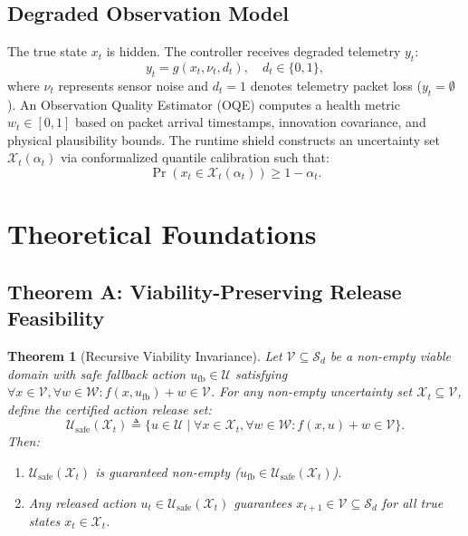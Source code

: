 \documentclass[conference]{IEEEtran}
\newtheorem{theorem}{Theorem}
\begin{document}
\subsection{Degraded Observation Model}
The true state $x_t$ is hidden. The controller receives degraded telemetry $y_t$:
\begin{equation}
y_t = g(x_t, \nu_t, d_t), \quad d_t \in \{0, 1\},
\end{equation}
where $\nu_t$ represents sensor noise and $d_t = 1$ denotes telemetry packet loss ($y_t = \emptyset$). 
An Observation Quality Estimator (OQE) computes a health metric $w_t \in [0, 1]$ based on packet arrival timestamps, innovation covariance, and physical plausibility bounds. The runtime shield constructs an uncertainty set $\mathcal{X}_t(\alpha_t)$ via conformalized quantile calibration \cite{romano_cqr_2019,gibbs_aci_2021} such that:
\begin{equation}
\Pr(x_t \in \mathcal{X}_t(\alpha_t)) \ge 1 - \alpha_t.
\end{equation}

\section{Theoretical Foundations}

\subsection{Theorem A: Viability-Preserving Release Feasibility}
\begin{theorem}[Recursive Viability Invariance]
Let $\mathcal{V} \subseteq \mathcal{S}_d$ be a non-empty viable domain with safe fallback action $u_{\mathrm{fb}} \in \mathcal{U}$ satisfying $\forall x \in \mathcal{V}, \forall w \in \mathcal{W}: f(x, u_{\mathrm{fb}}) + w \in \mathcal{V}$.
For any non-empty uncertainty set $\mathcal{X}_t \subseteq \mathcal{V}$, define the certified action release set:
\begin{equation}
\mathcal{U}_{\mathrm{safe}}(\mathcal{X}_t) \triangleq \{ u \in \mathcal{U} \mid \forall x \in \mathcal{X}_t, \forall w \in \mathcal{W}: f(x, u) + w \in \mathcal{V} \}.
\end{equation}
Then:
\begin{enumerate}
    \item $\mathcal{U}_{\mathrm{safe}}(\mathcal{X}_t)$ is guaranteed non-empty ($u_{\mathrm{fb}} \in \mathcal{U}_{\mathrm{safe}}(\mathcal{X}_t)$).
    \item Any released action $u_t \in \mathcal{U}_{\mathrm{safe}}(\mathcal{X}_t)$ guarantees $x_{t+1} \in \mathcal{V} \subseteq \mathcal{S}_d$ for all true states $x_t \in \mathcal{X}_t$.
\end{enumerate}
\end{theorem}
\end{document}

